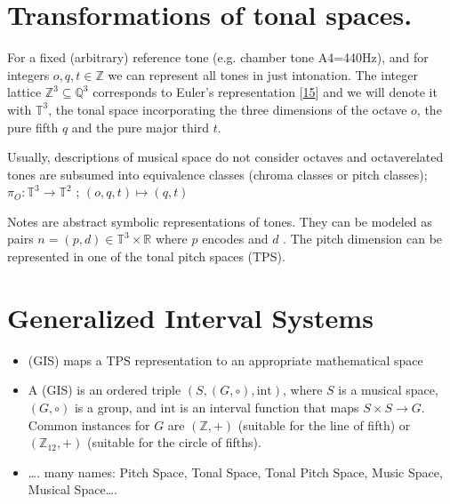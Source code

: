 \documentclass[letterpaper,10pt,english]{sphinxmanual}
\begin{document}
\section{Transformations of tonal spaces.}
\label{\detokenize{5_notes:transformations-of-tonal-spaces}}
\sphinxAtStartPar
For a fixed (arbitrary) reference tone (e.g. chamber tone A4=440Hz), and
for integers \(o, q, t \in \mathbb Z\) we can represent all tones in
just intonation. The integer lattice
\(\mathbb Z^3 \subseteq \mathbb Q^3\) corresponds to Euler’s
representation {[}\hyperlink{cite.8_bibliography:id5}{15}{]} and we will denote it with
\(\mathbb T^3\), the tonal space incorporating the three dimensions
of the octave \(o\), the pure fifth \(q\) and the pure major
third \(t\).

\sphinxAtStartPar
Usually, descriptions of musical space do not consider octaves and
octave\sphinxhyphen{}related tones are subsumed into equivalence classes (chroma
classes or pitch classes); \(\pi_O: \mathbb T^3 \to \mathbb T^2\) ;
\((o, q, t) \mapsto (q, t)\)

\sphinxAtStartPar
Notes are abstract symbolic representations of tones. They can be
modeled as pairs \(n=(p, d)\in \mathbb T^3 \times \mathbb R\) where
\(p\) encodes  and \(d\) . The pitch
dimension can be represented in one of the tonal pitch spaces (TPS).


\section{Generalized Interval Systems}
\label{\detokenize{5_notes:generalized-interval-systems}}\begin{itemize}
\item {} 
\sphinxAtStartPar
(GIS) maps a TPS representation to an appropriate mathematical space

\item {} 
\sphinxAtStartPar
A  (GIS) is an ordered triple
\((S, (G, \circ), \text{int})\), where \(S\) is a musical
space, \((G, \circ)\) is a group, and \(\text{int}\) is an
interval function that maps \(S \times S \to G\). Common
instances for \(G\) are \((\mathbb Z, +)\) (suitable for the
line of fifth) or \((\mathbb{Z}_{12}, +)\) (suitable for the
circle of fifths).

\item {} 
\sphinxAtStartPar
…. many names: Pitch Space, Tonal Space, Tonal Pitch Space, Music
Space, Musical Space….

\end{itemize}
\end{document}
